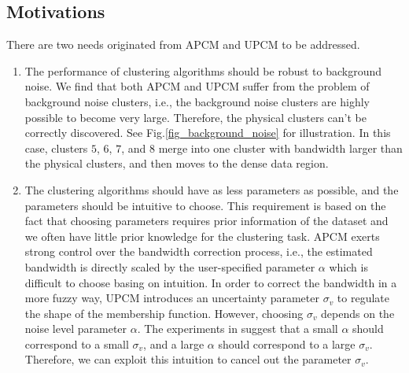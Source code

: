\documentclass[conference]{IEEEtran}
\theoremstyle{definition}
\begin{document}
\subsection{Motivations}
\label{sec-3-1}
There are two needs originated from APCM and UPCM to be addressed.
\begin{enumerate}
\item The performance of clustering algorithms should be robust to background noise. We find that both APCM and UPCM suffer from the problem of background noise clusters, i.e., the background noise clusters are highly possible to become very large. Therefore, the physical clusters can't be correctly discovered. See Fig.\ref{fig_background_noise} for illustration. In this case, clusters $5$, $6$, $7$, and $8$ merge into one cluster with bandwidth larger than the physical clusters, and then moves to the dense data region.
\item The clustering algorithms should have as less parameters as possible, and the parameters should be intuitive to choose. This requirement is based on the fact that choosing parameters requires prior information of the dataset and we often have little prior knowledge for the clustering task.
APCM exerts strong control over the bandwidth correction process, i.e., the estimated bandwidth is directly scaled by the user-specified parameter $\alpha$ which is difficult to choose basing on intuition. In order to correct the bandwidth in a more fuzzy way, UPCM introduces an uncertainty parameter $\sigma_v$ to regulate the shape of the membership function. However, choosing $\sigma_v$ depends on the noise level parameter $\alpha$. The experiments in \cite{hou_pcm_2016} suggest that a small $\alpha$ should correspond to a small $\sigma_v$, and a large $\alpha$ should correspond to a large $\sigma_v$. Therefore, we can exploit this intuition to cancel out the parameter $\sigma_v$.
\end{enumerate}
\end{document}
